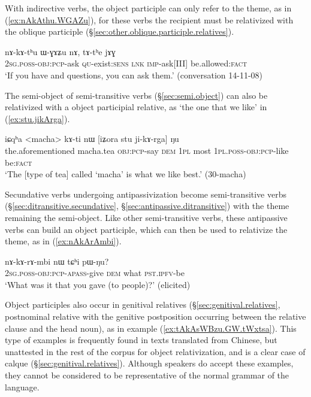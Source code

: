 With indirective verbs, the object participle can only refer to the theme, as in (\ref{ex:nAkAthu.WGAZu}), for these verbs the recipient must be relativized with the oblique participle  (§\ref{sec:other.oblique.participle.relatives}).

\begin{exe}
\ex \label{ex:nAkAthu.WGAZu}
\gll nɤ-kɤ-tʰu ɯ-ɣɤʑu nɤ, tɤ-tʰe jɤɣ \\
\textsc{2sg}.\textsc{poss}-\textsc{obj}:\textsc{pcp}-ask \textsc{qu}-exist:\textsc{sens} \textsc{lnk} \textsc{imp}-ask[III] be.allowed:\textsc{fact} \\
\glt `If you have and questions, you can ask them.' (conversation 14-11-08)
\end{exe}

The semi-object of semi-transitive verbs (§\ref{sec:semi.object}) can also be relativized with a object participial relative, as  `the one that we like' in (\ref{ex:stu.jikArga}).

\begin{exe}
\ex \label{ex:stu.jikArga}
\gll  iɕqʰa <macha> kɤ-ti nɯ [iʑora stu ji-kɤ-rga] ŋu \\
the.aforementioned macha.tea \textsc{obj}:\textsc{pcp}-say \textsc{dem} \textsc{1pl} most \textsc{1pl}.\textsc{poss}-\textsc{obj}:\textsc{pcp}-like be:\textsc{fact} \\
\glt `The [type of tea] called `macha' is what we like best.' (30-macha)
\end{exe}

Secundative verbs undergoing antipassivization become semi-transitive verbs (§\ref{sec:ditransitive.secundative}, §\ref{sec:antipassive.ditransitive}) with the theme remaining the semi-object. Like other semi-tran\-si\-tive verbs, these antipassive verbs can build an object participle, which can then be used to relativize the theme, as in (\ref{ex:nAkArAmbi}).

\begin{exe}
\ex \label{ex:nAkArAmbi}
\gll  nɤ-kɤ-rɤ-mbi nɯ tɕʰi pɯ-ŋu? \\
\textsc{2sg}.\textsc{poss}-\textsc{obj}:\textsc{pcp}-\textsc{apass}-give \textsc{dem} what \textsc{pst}.\textsc{ipfv}-be \\
\glt `What was it that you gave (to people)?' (elicited)
\end{exe}

Object participles also occur in genitival relatives (§\ref{sec:genitival.relatives}, postnominal relative with the genitive postposition  occurring between the relative clause and the head noun), as in example (\ref{ex:tAkAsWBzu.GW.tWxtsa}). This type of examples is frequently found in texts translated from Chinese, but unattested in the rest of the corpus for object relativization, and is a clear case of calque (§\ref{sec:genitival.relatives}). Although speakers do accept these examples, they cannot be considered to be representative of the normal grammar of the language.

